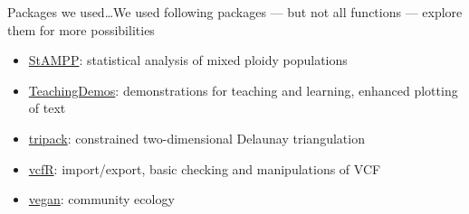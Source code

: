\documentclass[compress, xelatex, 11pt, xcolor=svgnames, aspectratio=169,
	hyperref={
		bookmarks=true,
		unicode=true,
		colorlinks=true,
		pdftitle={Molecular data in R},
		plainpages=false,
		pdfauthor={Vojtech Zeisek},
		pdfsubject={Course about phylogeny and evolution in R},
		pdfcreator={XeLaTeX},
		pdfkeywords={R, evolution, phylogeny, molecular data},
		linkcolor=Crimson, %
		anchorcolor=Magenta, %
		citecolor=Magenta, %
		filecolor=Magenta, %
		menucolor=Magenta, %
		urlcolor=DodgerBlue, %
		},
	url={hyphens, lowtilde} %
	]{beamer}
\begin{document}
\begin{frame}[allowframebreaks]{Packages we used\ldots}{We used following packages --- but not all functions --- explore them for more possibilities}
\begin{itemize}
		\item \href{https://CRAN.R-project.org/package=StAMPP}{StAMPP}: statistical analysis of mixed ploidy populations
		\item \href{https://CRAN.R-project.org/package=TeachingDemos}{TeachingDemos}: demonstrations for teaching and learning, enhanced plotting of text
		\item \href{https://CRAN.R-project.org/package=tripack}{tripack}: constrained two-dimensional Delaunay triangulation
		\item \href{https://CRAN.R-project.org/package=vcfR}{vcfR}: import/export, basic checking and manipulations of VCF
		\item \href{https://CRAN.R-project.org/package=vegan}{vegan}: community ecology
	\end{itemize}
\end{frame}
\end{document}

